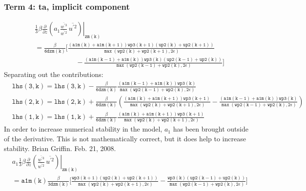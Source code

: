 \documentclass[11pt,fleqn]{article}
\newcommand{\ptlder}[2]{\frac{\partial #1}{\partial #2}}
\begin{document}
\subsubsection{Term 4:  ta, implicit component}
%
\begin{equation}
\begin{split}
& \left.
  \frac{1}{3} \beta
   \ptlder{}{z}
     \left( 
       a_1
       \frac{\overline{w^{'3}}}{\overline{w^{'2}}} \,
       \overline{u^{'2}}
     \right)
   \right|_{\mathtt{zm(k)}} \\
&= \mathtt{
    \frac{\beta}{6 dzm(k)}
    \bigg[ \frac{\left(a1m(k)+a1m(k+1)\right) wp3(k+1) \left(up2(k)+up2(k+1) \right)}
                {\max\left(wp2(k)+wp2(k+1),2\epsilon\right)} } \\
&  \mathtt{ \quad \quad \quad \quad \quad \quad
          -\frac{\left(a1m(k-1)+a1m(k)\right) wp3(k) \left(up2(k-1)+up2(k) \right)}
                {\max\left(wp2(k-1)+wp2(k),2\epsilon\right)}
    \bigg]
    }
\end{split}
\end{equation}
%
Separating out the contributions:
%
\begin{equation}
\begin{split}
& \mathtt{ 
   lhs(3,k) = lhs(3,k) - \frac{\beta}{6 dzm(k)}
                         \frac{\left(a1m(k-1)+a1m(k)\right) wp3(k)}
                      {\max\left(wp2(k-1)+wp2(k),2\epsilon\right)}
  } \\
& \mathtt{
   lhs(2,k) = lhs(2,k) + \frac{\beta}{6 dzm(k)}
                 \left(
                   \frac{\left(a1m(k)+a1m(k+1)\right) wp3(k+1)}
                        {\max\left(wp2(k)+wp2(k+1),2\epsilon\right)}
                  -\frac{\left(a1m(k-1)+a1m(k)\right) wp3(k)}
                        {\max\left(wp2(k-1)+wp2(k),2\epsilon\right)}
                 \right)
  } \\
& \mathtt{
   lhs(1,k) = lhs(1,k) + \frac{\beta}{6 dzm(k)}
                 \frac{\left(a1m(k)+a1m(k+1)\right) wp3(k+1)}
                      {\max\left(wp2(k)+wp2(k+1),2\epsilon\right)}
  }
\end{split}
\end{equation}
%
In order to increase numerical stability in the model, $a_{1}$ has been brought
outside of the derivative.  This is not mathematically correct, but it does 
help to increase stability.  Brian Griffin.  Feb. 21, 2008.
% 
\begin{equation}
\begin{split}
& \left.
  a_1
  \frac{1}{3} \beta
   \ptlder{}{z}
     \left( 
       \frac{\overline{w^{'3}}}{\overline{w^{'2}}} \,
       \overline{u^{'2}}
     \right)
   \right|_{\mathtt{zm(k)}} \\
&= \mathtt{
    a1m(k)\frac{\beta}{3 dzm(k)}
    \bigg[ \frac{wp3(k+1) \left(up2(k)+up2(k+1) \right)}
                {\max\left(wp2(k)+wp2(k+1),2\epsilon\right)}
          -\frac{wp3(k) \left(up2(k-1)+up2(k) \right)}
                {\max\left(wp2(k-1)+wp2(k),2\epsilon\right)}
    \bigg]
    }
\end{split}
\end{equation}
\end{document}
